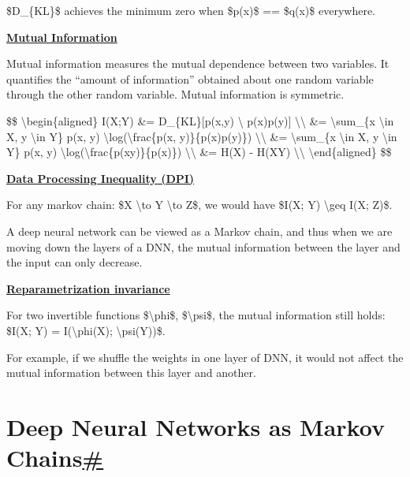 \$D\_\{KL\}\$ achieves the minimum zero when \$p(x)\$ == \$q(x)\$ everywhere.

\href{https://en.wikipedia.org/wiki/Mutual_information}{\textbf{Mutual Information}}

Mutual information measures the mutual dependence between two variables. It quantifies the ``amount of information'' obtained about one random variable through the other random variable. Mutual information is symmetric.

\$\$ \textbackslash begin\{aligned\} I(X;Y) \&= D\_\{KL\}{[}p(x,y) \textbackslash\textbar{} p(x)p(y){]} \textbackslash\textbackslash{} \&= \textbackslash sum\_\{x \textbackslash in X, y \textbackslash in Y\} p(x, y) \textbackslash log(\textbackslash frac\{p(x, y)\}\{p(x)p(y)\}) \textbackslash\textbackslash{} \&= \textbackslash sum\_\{x \textbackslash in X, y \textbackslash in Y\} p(x, y) \textbackslash log(\textbackslash frac\{p(x\textbar y)\}\{p(x)\}) \textbackslash\textbackslash{} \&= H(X) - H(X\textbar Y) \textbackslash\textbackslash{} \textbackslash end\{aligned\} \$\$

\href{https://en.wikipedia.org/wiki/Data_processing_inequality}{\textbf{Data Processing Inequality (DPI)}}

For any markov chain: \$X \textbackslash to Y \textbackslash to Z\$, we would have \$I(X; Y) \textbackslash geq I(X; Z)\$.

A deep neural network can be viewed as a Markov chain, and thus when we are moving down the layers of a DNN, the mutual information between the layer and the input can only decrease.

\href{https://en.wikipedia.org/wiki/Parametrization\#Parametrization_invariance}{\textbf{Reparametrization invariance}}

For two invertible functions \$\textbackslash phi\$, \$\textbackslash psi\$, the mutual information still holds: \$I(X; Y) = I(\textbackslash phi(X); \textbackslash psi(Y))\$.

For example, if we shuffle the weights in one layer of DNN, it would not affect the mutual information between this layer and another.

\section{\texorpdfstring{Deep Neural Networks as Markov Chains\hyperref[deep-neural-networks-as-markov-chains]{\#}}{Deep Neural Networks as Markov Chains\#}}\label{deep-neural-networks-as-markov-chains}

